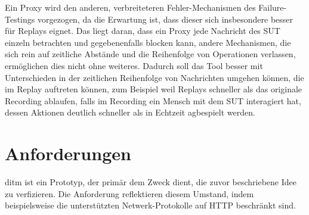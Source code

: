 \documentclass[12pt,a4paper]{report}
\begin{document}
Ein Proxy wird den anderen, verbreiteteren Fehler-Mechanismen des Failure-Testings vorgezogen, da die Erwartung ist, dass dieser
sich insbesondere besser für Replays eignet. Das liegt daran, dass ein Proxy jede Nachricht des SUT einzeln betrachten und
gegebenenfalls blocken kann, andere Mechanismen, die sich rein auf zeitliche Abstände und die Reihenfolge von Operationen
verlassen, ermöglichen dies nicht ohne weiteres. Dadurch soll das Tool besser mit Unterschieden in der zeitlichen Reihenfolge von
Nachrichten umgehen können, die im Replay auftreten können, zum Beispiel weil Replays schneller als das originale Recording
ablaufen, falls im Recording ein Mensch mit dem SUT interagiert hat, dessen Aktionen deutlich schneller als in Echtzeit agbespielt
werden.

\section{Anforderungen}
ditm ist ein Prototyp, der primär dem Zweck dient, die zuvor beschriebene Idee zu verfizieren.
Die Anforderung reflektieren diesem Umstand, indem beispielsweise die unterstützten Netwerk-Protokolle auf HTTP beschränkt sind.
\end{document}
